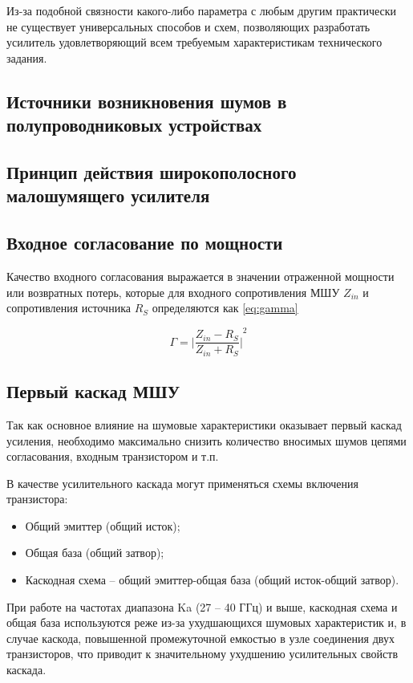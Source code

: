 Из-за подобной связности какого-либо параметра с любым другим практически не существует универсальных способов и схем, позволяющих разработать усилитель удовлетворяющий всем требуемым характеристикам технического задания.

\subsection{Источники возникновения шумов в полупроводниковых устройствах}

\subsection{Принцип действия широкополосного малошумящего усилителя}

\subsection{Входное согласование по мощности}
Качество входного согласования выражается в значении отраженной мощности или возвратных потерь, которые для входного сопротивления МШУ \(Z_{in}\) и сопротивления источника \(R_S\) определяются как \eqref{eq:gamma}

\begin{equation}
\label{eq:gamma}
\Gamma = {\Bigg| \frac{Z_{in} - R_S}{Z_{in} + R_S} \Bigg|}^2
\end{equation}

\subsection{Первый каскад МШУ}
Так как основное влияние на шумовые характеристики оказывает первый каскад усиления, необходимо максимально снизить количество вносимых шумов цепями согласования, входным транзистором и т.п.

В качестве усилительного каскада могут применяться схемы включения транзистора:
\begin{itemize}
	\item Общий эмиттер (общий исток);
	\item Общая база (общий затвор);
	\item Каскодная схема -- общий эмиттер-общая база (общий исток-общий затвор).
\end{itemize}

При работе на частотах диапазона Ka (27 -- 40 ГГц) и выше, каскодная схема и общая база используются реже из-за ухудшающихся шумовых характеристик и, в случае каскода, повышенной промежуточной емкостью в узле соединения двух транзисторов, что приводит к значительному ухудшению усилительных свойств каскада.

